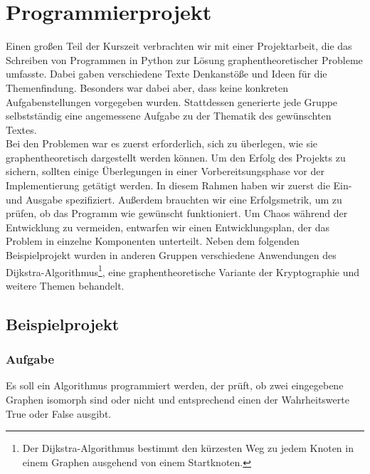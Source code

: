 \section{Programmierprojekt}
Einen großen Teil der Kurszeit verbrachten wir mit einer Projektarbeit, die das Schreiben von Programmen in Python zur Lösung graphentheoretischer Probleme umfasste. Dabei gaben verschiedene Texte Denkanstöße und Ideen für die Themenfindung. Besonders war dabei aber, dass keine konkreten Aufgabenstellungen vorgegeben wurden. Stattdessen generierte jede Gruppe selbstständig eine angemessene Aufgabe zu der Thematik des gewünschten Textes. \\
Bei den Problemen war es zuerst erforderlich, sich zu \"uberlegen, wie sie graphentheoretisch dargestellt werden können. Um den Erfolg des Projekts zu sichern, sollten einige Überlegungen in einer Vorbereitsungsphase vor der Implementierung getätigt werden. In diesem Rahmen haben wir zuerst die Ein- und Ausgabe spezifiziert. Au\ss erdem brauchten wir eine Erfolgsmetrik, um zu pr\"ufen, ob das Programm wie gew\"unscht funktioniert. Um Chaos w\"ahrend der Entwicklung zu vermeiden, entwarfen wir einen Entwicklungsplan, der das Problem in einzelne Komponenten unterteilt.
Neben dem folgenden Beispielprojekt wurden in anderen Gruppen verschiedene Anwendungen des Dijkstra-Algorithmus\footnote{Der Dijkstra-Algorithmus bestimmt den kürzesten Weg zu jedem Knoten in einem Graphen ausgehend von einem Startknoten.}, eine graphentheoretische Variante der Kryptographie und weitere Themen behandelt.
\subsection{Beispielprojekt}
\subsubsection{Aufgabe} Es soll ein Algorithmus programmiert werden, der pr\"uft, ob zwei eingegebene Graphen isomorph sind oder nicht und entsprechend einen der Wahrheitswerte {\glqq True\grqq} oder {\glqq False\grqq} ausgibt.

